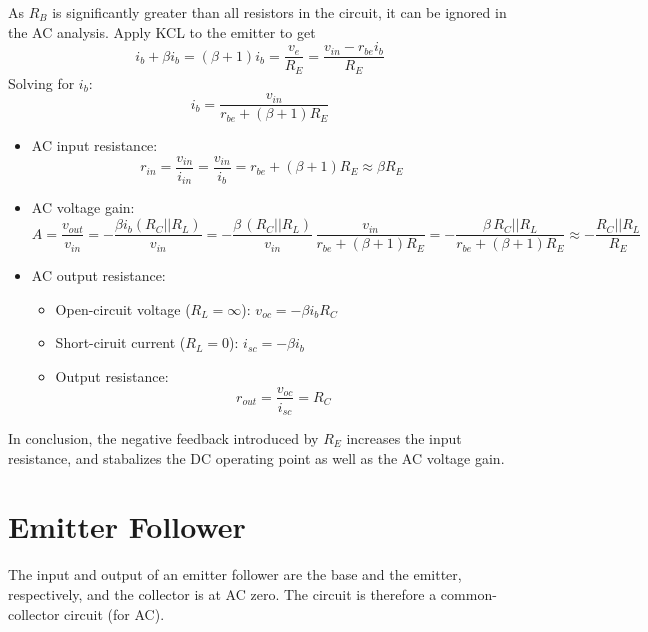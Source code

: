 \documentclass{article}
\begin{document}
As $R_B$ is significantly greater than all resistors in the circuit, it can
be ignored in the AC analysis. Apply KCL to the emitter to get
\begin{equation}
i_b+\beta i_b=(\beta+1)i_b=\frac{v_e}{R_E}=\frac{v_{in}-r_{be}i_b}{R_E}
\end{equation}
Solving for $i_b$:
\begin{equation}
i_b=\frac{v_{in}}{r_{be}+(\beta+1)R_E}
\end{equation}
\begin{itemize}
\item AC input resistance:
  \begin{equation}
  r_{in}=\frac{v_{in}}{i_{in}}=\frac{v_{in}}{i_b}=r_{be}+(\beta+1)R_E
  \approx \beta R_E
  \end{equation}
\item AC voltage gain:
  \begin{equation}
  A=\frac{v_{out}}{v_{in}}=-\frac{\beta i_b (R_C||R_L)}{v_{in}}
  =-\frac{\beta\,(R_C||R_L)}{v_{in}}\,\frac{v_{in}}{r_{be}+(\beta+1)R_E} 
  =-\frac{\beta\,R_C||R_L}{r_{be}+(\beta+1)R_E}
  \approx -\frac{R_C||R_L}{R_E}
  \end{equation}
\item AC output resistance:
  \begin{itemize}
  \item Open-circuit voltage ($R_L=\infty$):
    $v_{oc}=-\beta i_b R_C$
  \item Short-ciruit current ($R_L=0$):
    $i_{sc}=-\beta i_b$
  \item Output resistance:
    \begin{equation}
    r_{out}=\frac{v_{oc}}{i_{sc}}=R_C
    \end{equation}
  \end{itemize}
\end{itemize}
In conclusion, the negative feedback introduced by $R_E$ increases the 
input resistance, and stabalizes the DC operating point as well as the 
AC voltage gain.


\section*{Emitter Follower}

The input and output of an emitter follower are the base and the 
emitter, respectively, and the collector is at AC zero. The circuit 
is therefore a common-collector circuit (for AC).

\end{document}
